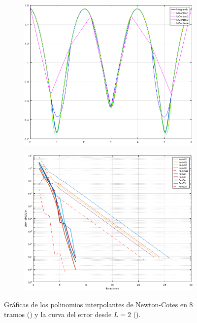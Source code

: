 \documentclass{article}
\begin{document}
    \begin{figure}[h]
        \centering
        \begin{subfigure}{0.49\textwidth}
            \includegraphics[width=1\textwidth, height=0.7\textwidth]{fig4}
            \caption{\label{fig:3a}}
        \end{subfigure}
        \begin{subfigure}{0.49\textwidth}
            \includegraphics[width=1\textwidth, height=0.7\textwidth]{fig5}
            \caption{\label{fig:3b}}
        \end{subfigure}
        \captionsetup{justification=centering}
        \caption{Gráficas de los polinomios interpolantes de Newton-Cotes en 8 tramos () y la curva del error desde \(L=2\) ().}
        \label{fig3}
    \end{figure}
\end{document}
